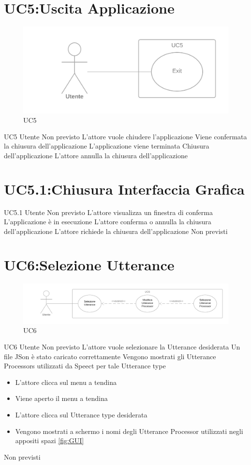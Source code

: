 \documentclass[../AnalisideiRequisiti.tex]{subfiles}
\begin{document}
\section{UC5:Uscita Applicazione}
\begin{figure}[H]
	\caption{UC5}
	\centering
	\includegraphics[width=\textwidth]{../img/UC05.png}
\end{figure}
\UserCase
{UC5}
{Utente}
{Non previsto}
{L'attore vuole chiudere l'applicazione}
{Viene confermata la chiusura dell'applicazione}
{L'applicazione viene terminata}
{Chiusura dell'applicazione}
{L'attore annulla la chiusura dell'applicazione}

\section{UC5.1:Chiusura Interfaccia Grafica}
\UserCase
{UC5.1}
{Utente}
{Non previsto}
{L'attore visualizza un finestra di conferma}
{L'applicazione è in esecuzione}
{L'attore conferma o annulla la chiusura dell'applicazione}
{L'attore richiede la chiusura dell'applicazione}
{Non previsti}

\section{UC6:Selezione Utterance}
\begin{figure}[H]
	\caption{UC6}
	\centering
	\includegraphics[width=\textwidth]{../img/UC06.png}
\end{figure}
\UserCase
{UC6}
{Utente}
{Non previsto}
{L'attore vuole selezionare la Utterance desiderata}
{Un file JSon è stato caricato correttamente  }
{Vengono mostrati gli Utterance Processors utilizzati da Speect per tale Utterance type}
{
	\begin{itemize}
		\item{} L'attore clicca sul menu a tendina
		\item{} Viene aperto il menu a tendina
		\item{} L'attore clicca sul Utterance type desiderata
		\item{} Vengono mostrati a schermo i nomi degli Utterance Processor utilizzati negli appositi spazi \ref{fig:GUI}		
	\end{itemize}
}
{Non previsti}
\end{document}
